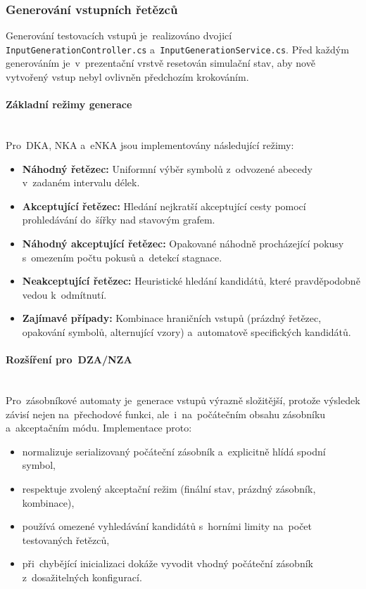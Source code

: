 \documentclass[
  master,
  program=ainfvs,
  printversion,
  figures=false,
  tables=false,
  glossaries,
  index
]{kidiplom}
\begin{document}
\subsubsection{Generování vstupních řetězců}

Generování testovacích vstupů je~realizováno dvojicí \texttt{Input\-Generation\-Con\-tro\-ll\-er.cs} a~\texttt{InputGenerationService.cs}. Před každým generováním je~v~prezentační vrstvě resetován simulační stav, aby nově vytvořený vstup nebyl ovlivněn předchozím krokováním.

\paragraph{Základní režimy generace} \mbox{} \\
Pro~\gls{DKA}, \gls{NKA} a~\gls{eNKA} jsou implementovány následující režimy:

\begin{itemize}
    \item \textbf{Náhodný řetězec:} Uniformní výběr symbolů z~odvozené abecedy v~zadaném intervalu délek.
    \item \textbf{Akceptující řetězec:} Hledání nejkratší akceptující cesty pomocí prohledávání do~šířky nad stavovým grafem.
    \item \textbf{Náhodný akceptující řetězec:} Opakované náhodně procházející pokusy s~omezením počtu pokusů a~detekcí stagnace.
    \item \textbf{Neakceptující řetězec:} Heuristické hledání kandidátů, které pravděpodobně vedou k~odmítnutí.
    \item \textbf{Zajímavé případy:} Kombinace hraničních vstupů (prázdný řetězec, opakování symbolů, alternující vzory) a~automatově specifických kandidátů.
\end{itemize}

\paragraph{Rozšíření pro~\gls{DZA}/\gls{NZA}} \mbox{} \\
Pro~zásobníkové automaty je~generace vstupů výrazně složitější, protože výsledek závisí nejen na~přechodové funkci, ale~i~na~počátečním obsahu zásobníku a~akceptačním módu. Implementace proto:

\begin{itemize}
    \item normalizuje serializovaný počáteční zásobník a~explicitně hlídá spodní symbol,
    \item respektuje zvolený akceptační režim (finální stav, prázdný zásobník, kombinace),
    \item používá omezené vyhledávání kandidátů s~horními limity na~počet testovaných řetězců,
    \item při~chybějící inicializaci dokáže vyvodit vhodný počáteční zásobník z~dosažitelných konfigurací.
\end{itemize}
\end{document}
